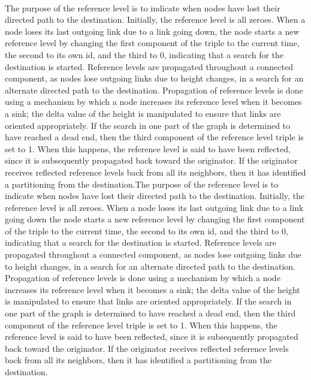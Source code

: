 \paragraph{}The purpose of the reference level is to indicate when nodes have lost their directed path to the destination. Initially, the reference level is all zeroes. When a node loses its last outgoing link due to a link going down, the node starts a new reference level by changing the first component of the triple to the current time, the second to its own id, and the third to 0, indicating that a search for the destination is started. Reference levels are propagated throughout a connected component, as nodes lose outgoing links due to height changes, in a search for an alternate directed path to the destination. Propagation of reference levels is done using a mechanism by which a node increases its reference level when it becomes a sink; the delta value of the height is manipulated to ensure that links are oriented appropriately. If the search in one part of the graph is determined to have reached a dead end, then the third component of the reference level triple is set to 1. When this happens, the reference level is said to have been reflected, since it is subsequently propagated back toward the originator. If the originator receives reflected reference levels back from all its neighbors, then it has identified a partitioning from the destination.The purpose of the reference level is to indicate when nodes have lost their directed path to the destination. Initially, the reference level is all zeroes. When a node loses its last outgoing link due to a link going down the node starts a new reference level by changing the first component of the triple to the current time, the second to its own id, and the third to 0, indicating that a search for the destination is started. Reference levels are propagated throughout a connected component, as nodes lose outgoing links due to height changes, in a search for an alternate directed path to the destination. Propagation of reference levels is done using a mechanism by which a node increases its reference level when it becomes a sink; the delta value of the height is manipulated to ensure that links are oriented appropriately. If the search in one part of the graph is determined to have reached a dead end, then the third component of the reference level triple is set to 1. When this happens, the reference level is said to have been reflected, since it is subsequently propagated back toward the originator. If the originator receives reflected reference levels back from all its neighbors, then it has identified a partitioning from the destination.

